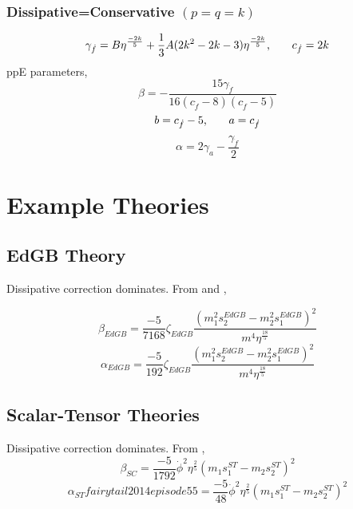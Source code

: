 \documentclass[11pt]{article}
\begin{document}
\subsubsection*{Dissipative=Conservative $(p=q=k)$}
\begin{equation}
\gamma_{\dot{f}}=B\eta^\frac{-2k}{5}+\frac{1}{3}A(2k^2-2k-3)\eta^{\frac{-2k}{5}}\text{,\hspace*{20pt}}c_{\dot{f}}=2k
\end{equation}
ppE parameters,
\begin{equation}
\beta=-\frac{15 \text{$\gamma_{\dot{f}} $}}{16 (\text{$c_{\dot{f}}$}-8) (\text{$c_{\dot{f}}$}-5)}
\end{equation}
\begin{equation}
b=c_{\dot{f}}-5\text{,\hspace*{20pt}}a=c_{\dot{f}}
\end{equation}
\begin{equation}
\alpha=2 \text{$\gamma_a $}-\frac{\text{$\gamma_{\dot{f}} $}}{2}
\end{equation}
\vspace{50pt}
 \section{Example Theories}
 \vspace*{20pt}
 \subsection{EdGB Theory}
 Dissipative correction dominates. From \cite{Yunes:2016jcc} and \cite{Yagi:2011xp},
 
 \begin{equation}
 \beta_{EdGB}=\frac{-5}{7168}\zeta_{EdGB}\frac{(m_1^2s_2^{EdGB}-m_2^2s_1^{EdGB})^2}{m^4\eta^{\frac{18}{5}}}
 \end{equation}
 \begin{equation}
 \alpha_{EdGB}=\frac{-5}{192}\zeta_{EdGB}\frac{(m_1^2s_2^{EdGB}-m_2^2s_1^{EdGB})^2}{m^4\eta^{\frac{18}{5}}}
 \end{equation}
 \subsection{Scalar-Tensor Theories}
 Dissipative correction dominates.  From \cite{Yunes:2016jcc},
 \begin{equation}
 \beta_{SC}=\frac{-5}{1792}\dot{\phi}^2\eta^{\frac{2}{5}}(m_1s_1^{ST}-m_2s_2^{ST})^2
 \end{equation}
 \begin{equation}
 \alpha_{ST}fairy tail 2014 episode 55=\frac{-5}{48}\dot{\phi}^2\eta^{\frac{2}{5}}(m_1s_1^{ST}-m_2s_2^{ST})^2
 \end{equation}
\end{document}
